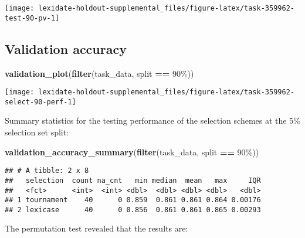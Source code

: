 \documentclass[
]{book}
\newenvironment{Shaded}{\begin{snugshade}}{\end{snugshade}}
\newcommand{\FunctionTok}[1]{\textcolor[rgb]{0.13,0.29,0.53}{\textbf{#1}}}
\newcommand{\NormalTok}[1]{#1}
\newcommand{\SpecialCharTok}[1]{\textcolor[rgb]{0.81,0.36,0.00}{\textbf{#1}}}
\newcommand{\StringTok}[1]{\textcolor[rgb]{0.31,0.60,0.02}{#1}}
\begin{document}
\texttt{[image: lexidate-holdout-supplemental\_files/figure-latex/task-359962-test-90-pv-1]}

\hypertarget{validation-accuracy-58}{%
\subsection{Validation accuracy}\label{validation-accuracy-58}}

\begin{Shaded}
\begin{Highlighting}[]
\FunctionTok{validation\_plot}\NormalTok{(}\FunctionTok{filter}\NormalTok{(task\_data, split }\SpecialCharTok{==} \StringTok{\textquotesingle{}90\%\textquotesingle{}}\NormalTok{))}
\end{Highlighting}
\end{Shaded}

\texttt{[image: lexidate-holdout-supplemental\_files/figure-latex/task-359962-select-90-perf-1]}

Summary statistics for the testing performance of the selection schemes at the 5\% selection set split:

\begin{Shaded}
\begin{Highlighting}[]
\FunctionTok{validation\_accuracy\_summary}\NormalTok{(}\FunctionTok{filter}\NormalTok{(task\_data, split }\SpecialCharTok{==} \StringTok{\textquotesingle{}90\%\textquotesingle{}}\NormalTok{))}
\end{Highlighting}
\end{Shaded}

\begin{verbatim}
## # A tibble: 2 x 8
##   selection  count na_cnt   min median  mean   max     IQR
##   <fct>      <int>  <int> <dbl>  <dbl> <dbl> <dbl>   <dbl>
## 1 tournament    40      0 0.859  0.861 0.861 0.864 0.00176
## 2 lexicase      40      0 0.856  0.861 0.861 0.865 0.00293
\end{verbatim}

The permutation test revealed that the results are:
\end{document}
